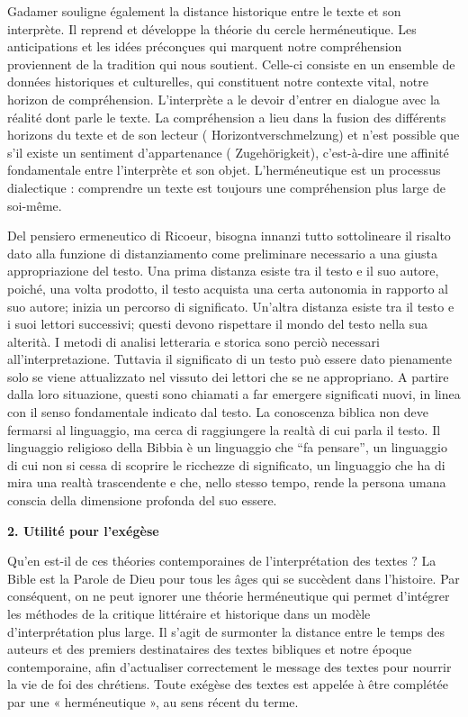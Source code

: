 Gadamer souligne également la distance historique entre le texte et son interprète. Il reprend et développe la théorie du cercle herméneutique. Les anticipations et les idées préconçues qui marquent notre compréhension proviennent de la tradition qui nous soutient. Celle-ci consiste en un ensemble de données historiques et culturelles, qui constituent notre contexte vital, notre horizon de compréhension. L'interprète a le devoir d'entrer en dialogue avec la réalité dont parle le texte. La compréhension a lieu dans la fusion des différents horizons du texte et de son lecteur ( Horizontverschmelzung) et n'est possible que s'il existe un sentiment d'appartenance ( Zugehörigkeit), c'est-à-dire une affinité fondamentale entre l'interprète et son objet. L'herméneutique est un processus dialectique : comprendre un texte est toujours une compréhension plus large de soi-même.   

Del pensiero ermeneutico di Ricoeur, bisogna innanzi tutto sottolineare il risalto dato alla funzione di distanziamento come preliminare necessario a una giusta appropriazione del testo. Una prima distanza esiste tra il testo e il suo autore, poiché, una volta prodotto, il testo acquista una certa autonomia in rapporto al suo autore; inizia un percorso di significato. Un'altra distanza esiste tra il testo e i suoi lettori successivi; questi devono rispettare il mondo del testo nella sua alterità. I metodi di analisi letteraria e storica sono perciò necessari all'interpretazione. Tuttavia il significato di un testo può essere dato pienamente solo se viene attualizzato nel vissuto dei lettori che se ne appropriano. A partire dalla loro situazione, questi sono chiamati a far emergere significati nuovi, in linea con il senso fondamentale indicato dal testo. La conoscenza biblica non deve fermarsi al linguaggio, ma cerca di raggiungere la realtà di cui parla il testo. Il linguaggio religioso della Bibbia è un linguaggio che “fa pensare”, un linguaggio di cui non si cessa di scoprire le ricchezze di significato, un linguaggio che ha di mira una realtà trascendente e che, nello stesso tempo, rende la persona umana conscia della dimensione profonda del suo essere.   

\textbf{2. Utilité pour l'exégèse  }

Qu'en est-il de ces théories contemporaines de l'interprétation des textes ? La Bible est la Parole de Dieu pour tous les âges qui se succèdent dans l'histoire. Par conséquent, on ne peut ignorer une théorie herméneutique qui permet d'intégrer les méthodes de la critique littéraire et historique dans un modèle d'interprétation plus large. Il s'agit de surmonter la distance entre le temps des auteurs et des premiers destinataires des textes bibliques et notre époque contemporaine, afin d'actualiser correctement le message des textes pour nourrir la vie de foi des chrétiens. Toute exégèse des textes est appelée à être complétée par une « herméneutique », au sens récent du terme.   

